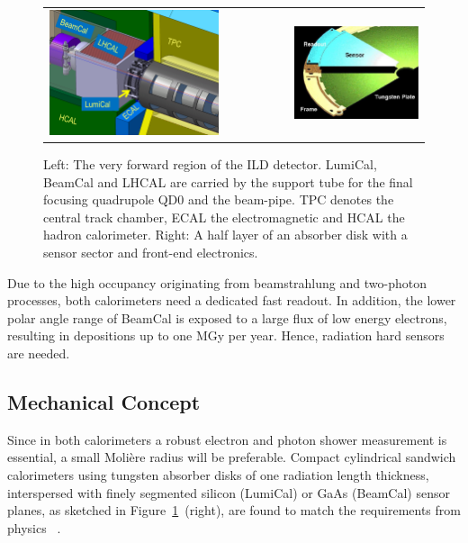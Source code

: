 \begin{figure}[hbp]
\begin{center}
 \begin{tabular}{rrr}
   \includegraphics[width=0.45\columnwidth]{Calorimeter/FCAL/figs/forward_region_new}
    &~~~~~~~~&
   \includegraphics[width=0.45\columnwidth]{Calorimeter/FCAL/figs/BClayer}
   \end{tabular}
  \end{center}
\caption{Left: The very forward region of the ILD detector.
LumiCal, BeamCal and LHCAL are carried by
the support tube for the final focusing quadrupole QD0 and the beam-pipe.
TPC denotes the central track chamber, ECAL the electromagnetic and
HCAL the hadron calorimeter.
Right: A half layer of an absorber disk with a sensor sector and front-end electronics.
}
\label{fig:Forward_structure}
\end{figure}
Due to the high occupancy originating from beamstrahlung and two-photon processes,
both calorimeters need a dedicated fast readout.
In addition, the lower polar angle range of BeamCal is exposed to a large flux
of low energy electrons, resulting in depositions up to one
MGy per year. Hence, radiation hard sensors are needed.



\subsection{Mechanical Concept}
Since in both calorimeters a robust electron and photon shower measurement
is essential, a small Moli\`{e}re radius will be preferable.
Compact
cylindrical sandwich
calorimeters using tungsten absorber disks of one radiation length thickness, interspersed with
finely segmented silicon (LumiCal) or GaAs (BeamCal) sensor planes, as sketched in
Figure~\ref{fig:Forward_structure}~(right),
are found
to match the requirements from physics~\cite{2010JInst...512002A} .


